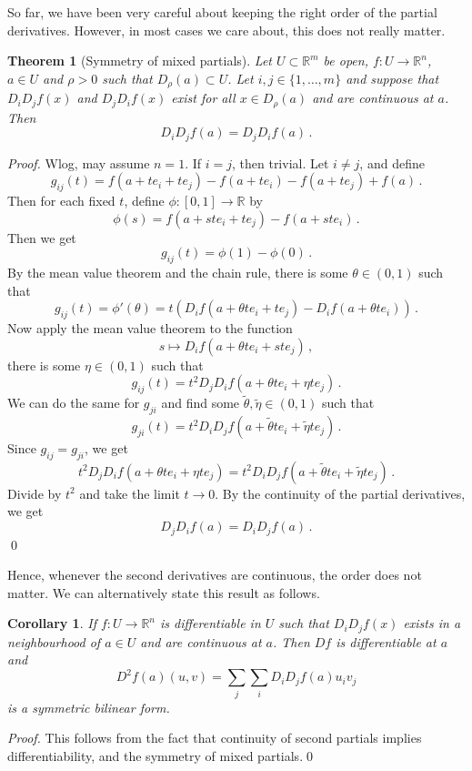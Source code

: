 \documentclass{article}
\theoremstyle{plain}\theoremheaderfont{\normalfont\itshape}\theorembodyfont{\rmfamily}\theoremseparator{.}\newtheorem*{rem}{Remark}\newtheorem*{ex}{Example}\newtheorem*{proof}{Proof}\newtheorem*{altp}{Alternative proof}
\theoremstyle{plain}\theoremheaderfont{\normalfont\bfseries}\theorembodyfont{\rmfamily}\theoremseparator{.}\newtheorem{thm}{Theorem}[section]\newtheorem{lem}[thm]{Lemma}\newtheorem{prop}[thm]{Proposition}\newtheorem*{cor}{Corollary}\newtheorem{defn}[thm]{Definition}\newtheorem{clm}[thm]{Claim}\newtheorem{clminproof}{Claim}
\theoremstyle{break}\theoremheaderfont{\normalfont\itshape}\theorembodyfont{\rmfamily}\theoremseparator{.\medskip}\newtheorem*{proofskip}{Proof}\newtheorem*{exs}{Examples}\newtheorem*{rems}{Remarks}
\theoremstyle{break}\theoremheaderfont{\normalfont\bfseries}\theorembodyfont{\rmfamily}\theoremseparator{.\medskip}\newtheorem{lemskip}[thm]{Lemma}\newtheorem{defnskip}[thm]{Definition}\newtheorem{propskip}[thm]{Proposition}\newtheorem{thmskip}[thm]{Theorem}
\newcommand{\qed}{\hfill\ensuremath{\Box}}
\begin{document}
    So far, we have been very careful about keeping the right order of the partial derivatives. However, in most cases we care about, this does not really matter.
    \begin{thm}[Symmetry of mixed partials]
        Let \(U\subset\mathbb{R}^m\) be open, \(f:U\to\mathbb{R}^n\), \(a\in U\) and \(\rho>0\) such that \(D_\rho(a)\subset U\). Let \(i,j\in\{1,\dots,m\}\) and suppose that \(D_iD_jf(x)\) and \(D_jD_if(x)\) exist for all \(x\in D_\rho(a)\) and are continuous at \(a\). Then
        \[D_iD_jf(a)=D_jD_if(a)\,.\]
    \end{thm}
    \begin{proof}
        Wlog, may assume \(n=1\). If \(i=j\), then trivial. Let \(i\ne j\), and define
        \[g_{ij}(t)=f(a+te_i+te_j)-f(a+te_i)-f(a+te_j)+f(a)\,.\]
        Then for each fixed \(t\), define \(\phi:[0,1]\to\mathbb{R}\) by
        \[\phi(s)=f(a+ste_i+te_j)-f(a+ste_i)\,.\]
        Then we get
        \[g_{ij}(t)=\phi(1)-\phi(0)\,.\]
        By the mean value theorem and the chain rule, there is some \(\theta\in(0,1)\) such that
        \[g_{ij}(t)=\phi'(\theta)=t(D_if(a+\theta te_i+te_j)-D_if(a+\theta te_i))\,.\]
        Now apply the mean value theorem to the function
        \[s\mapsto D_if(a+\theta te_i+ste_j)\,,\]
        there is some \(\eta\in(0,1)\) such that
        \[g_{ij}(t)=t^2D_jD_if(a+\theta te_i+\eta te_j)\,.\]
        We can do the same for \(g_{ji}\) and find some \(\tilde{\theta},\tilde{\eta}\in(0,1)\) such that
        \[g_{ji}(t)=t^2D_iD_jf(a+\tilde{\theta}t e_i+\tilde{\eta}te_j)\,.\]
        Since \(g_{ij}=g_{ji}\), we get
        \[t^2D_jD_if(a+\theta te_i+\eta te_j)=t^2D_iD_jf(a+\tilde{\theta}te_i+\tilde{\eta}te_j)\,.\]
        Divide by \(t^2\) and take the limit \(t\to 0\). By the continuity of the partial derivatives, we get
        \[D_jD_if(a)=D_iD_jf(a)\,.\]\qed
    \end{proof}

    Hence, whenever the second derivatives are continuous, the order does not matter. We can alternatively state this result as follows.
    \begin{cor}
        If \(f:U\to\mathbb{R}^n\) is differentiable in \(U\) such that \(D_iD_jf(x)\) exists in a neighbourhood of \(a\in U\) and are continuous at \(a\). Then \(Df\) is differentiable at \(a\) and
        \[D^2f(a)(u,v)=\sum_{j}\sum_{i}D_iD_jf(a)u_iv_j\]
        is a symmetric bilinear form.
    \end{cor}
    \begin{proof}
        This follows from the fact that continuity of second partials implies differentiability, and the symmetry of mixed partials.\qed
    \end{proof}
\end{document}
